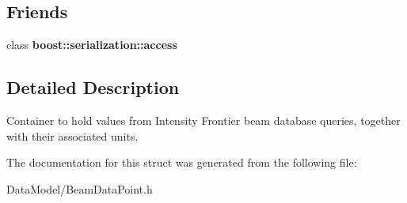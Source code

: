 \subsection*{Friends}
\begin{DoxyCompactItemize}
\item 
\hypertarget{structBeamDataPoint_ac98d07dd8f7b70e16ccb9a01abf56b9c}{class {\bfseries boost\-::serialization\-::access}}\label{structBeamDataPoint_ac98d07dd8f7b70e16ccb9a01abf56b9c}

\end{DoxyCompactItemize}


\subsection{Detailed Description}
Container to hold values from Intensity Frontier beam database queries, together with their associated units. 

The documentation for this struct was generated from the following file\-:\begin{DoxyCompactItemize}
\item 
Data\-Model/Beam\-Data\-Point.\-h\end{DoxyCompactItemize}
